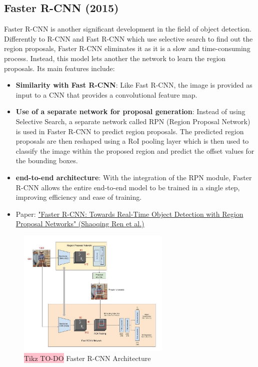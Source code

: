 \subsection{Faster R-CNN (2015)}
Faster R-CNN is another significant development in the field of object detection. Differently to R-CNN and Fast R-CNN which use selective search to find out the region proposals, Faster R-CNN eliminates it as it is a slow and time-consuming process. Instead,  this model lets another the network to learn the region proposals. Its main features include:

\begin{itemize}
    \item \textbf{Similarity with Fast R-CNN}: Like Fast R-CNN, the image is provided as input to a CNN that provides a convolutional feature map.
    \item \textbf{Use of a separate network for proposal generation}: Instead of using Selective Search, a separate network called RPN (Region Proposal Network) is used in Faster R-CNN to predict region proposals. The predicted region proposals are then reshaped using a RoI pooling layer which is then used to classify the image within the proposed region and predict the offset values for the bounding boxes.
    \item \textbf{end-to-end architecture}: With the integration of the RPN module, Faster R-CNN allows the entire end-to-end model to be trained in a single step, improving efficiency and ease of training.
    \item Paper: \href{https://arxiv.org/pdf/1506.01497.pdf}{"Faster R-CNN: Towards Real-Time Object Detection with Region Proposal Networks" (Shaoqing Ren et al.)}
\end{itemize}


\begin{figure}[!htbp]
    \centering
    \includegraphics[width=0.65\textwidth]{tikz/chapter5 - Faster R-CNN.jpeg}
    \caption{{\color{red}\colorbox{pink}{Tikz TO-DO}} Faster R-CNN Architecture}
\end{figure}



